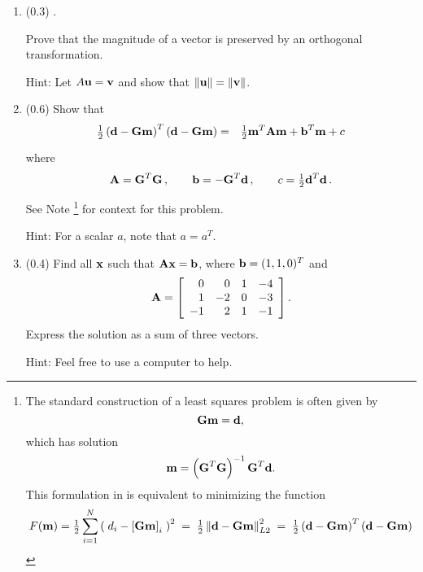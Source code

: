 \documentclass[11pt,titlepage,fleqn]{article}
\begin{document}
\begin{enumerate}

\item (0.3) \citep[][p.~473, P10]{SteinWysession}.

Prove that the magnitude of a vector is preserved by an orthogonal transformation.

Hint: Let $A\mbox{${\bf u}$} = \mbox{${\bf v}$}$ and show that $\|\mbox{${\bf u}$}\| = \|\mbox{${\bf v}$}\|$.


\item (0.6) Show that 
%
\begin{eqnarray}
\hlf \left( \bd - \bG\bem \right)^T \left( \bd - \bG\bem \right)
&=& \hlf \bem^T\bA\bem + \bb^T\bem + c
\label{lsq1}
\end{eqnarray}
%
where
%
\begin{equation}
\bA = \bG^T\bG
\,,\hspace{20pt}
\bb = -\bG^T\bd
\,,\hspace{20pt}
c = \hlf\bd^T\bd
\,.
\end{equation}
%
See Note \footnote{The standard construction of a least squares problem is often given by
%
\begin{equation}
\mbox{${\bf G}$}\mbox{${\bf m}$} = \mbox{${\bf d}$},
\label{lsq}
\end{equation}
%
which has solution
%
\begin{equation}
\mbox{${\bf m}$} = \left( \mbox{${\bf G}$}^T\mbox{${\bf G}$} \right)^{-1} \mbox{${\bf G}$}^T \mbox{${\bf d}$}.
\label{lsq_sol}
\end{equation}
%
This formulation in  is equivalent to minimizing the function
%
\begin{equation}
F(\bem) = \hlf \sum_{i=1}^N \left(\;d_i - \left[ \bG\bem \right]_i \;\right)^2
\;=\; \hlf \left\| \bd  - \bG\bem \right\|_{L2}^2
\;=\; \hlf \left( \bd  - \bG\bem \right)^T \left( \bd - \bG\bem \right)
\end{equation}
}
for context for this problem.

Hint: For a scalar $a$, note that $a = a^T$.


\item (0.4) Find all $\mbox{${\bf x}$}$ such that $\mbox{${\bf A}$}\mbox{${\bf x}$} = \mbox{${\bf b}$}$, where $\mbox{${\bf b}$} = (1, 1, 0)^T$ and
%
\begin{eqnarray*}
\mbox{${\bf A}$} =  \left[ \begin{array}{rrrr}
     0  &   0  &   1 & -4 \\
     1  &   -2  &   0 & -3 \\
     -1  &   2  &   1 & -1 \\
\end{array} \right].
\end{eqnarray*}
%
Express the solution as a sum of three vectors.

Hint: Feel free to use a computer to help.

\end{enumerate}
\end{document}
